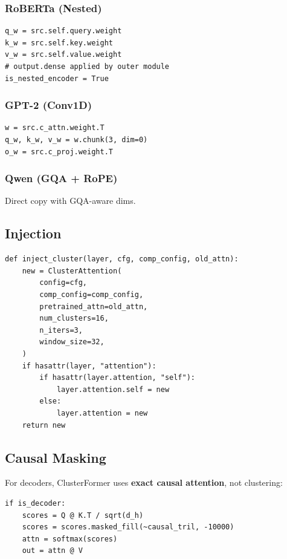 \subsubsection{RoBERTa (Nested)}
\begin{lstlisting}
q_w = src.self.query.weight
k_w = src.self.key.weight
v_w = src.self.value.weight
# output.dense applied by outer module
is_nested_encoder = True
\end{lstlisting}

\subsubsection{GPT-2 (Conv1D)}
\begin{lstlisting}
w = src.c_attn.weight.T
q_w, k_w, v_w = w.chunk(3, dim=0)
o_w = src.c_proj.weight.T
\end{lstlisting}

\subsubsection{Qwen (GQA + RoPE)}
Direct copy with GQA-aware dims.

\subsection{Injection}

\begin{lstlisting}
def inject_cluster(layer, cfg, comp_config, old_attn):
    new = ClusterAttention(
        config=cfg,
        comp_config=comp_config,
        pretrained_attn=old_attn,
        num_clusters=16,
        n_iters=3,
        window_size=32,
    )
    if hasattr(layer, "attention"):
        if hasattr(layer.attention, "self"):
            layer.attention.self = new
        else:
            layer.attention = new
    return new
\end{lstlisting}

\subsection{Causal Masking}

For decoders, ClusterFormer uses \textbf{exact causal attention}, not clustering:

\begin{lstlisting}
if is_decoder:
    scores = Q @ K.T / sqrt(d_h)
    scores = scores.masked_fill(~causal_tril, -10000)
    attn = softmax(scores)
    out = attn @ V
\end{lstlisting}

